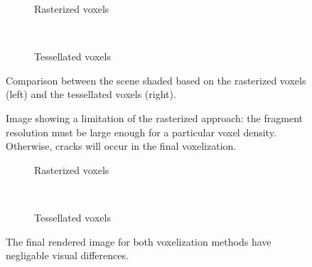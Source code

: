 \begin{figure}
\begin{subfigure}[t]{0.475\textwidth}
    \caption{Rasterized voxels}
\end{subfigure}
~
\begin{subfigure}[t]{0.475\textwidth}
    \caption{Tessellated voxels}
\end{subfigure}
\caption{Comparison between the scene shaded based on the rasterized voxels (left) and the tessellated voxels (right).}
\label{fig:voxelcomparison}
\end{figure}

\begin{figure}
\centering
\begin{subfigure}[t]{0.475\textwidth}
\end{subfigure}
\caption{Image showing a limitation of the rasterized approach: the fragment resolution must be large enough for a particular voxel density. Otherwise, cracks will occur in the final voxelization.}
\label{fig:voxellimitations}
\end{figure}

\begin{figure}[h!]
\centering
    \begin{subfigure}[t]{0.475\textwidth}
        \caption{Rasterized voxels}
    \end{subfigure}
    ~
    \begin{subfigure}[t]{0.475\textwidth}
        \caption{Tessellated voxels}
    \end{subfigure}
    \caption{The final rendered image for both voxelization methods have negligable visual differences.}
    \label{fig:results_voxelization}
\end{figure}

